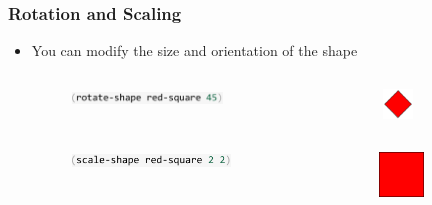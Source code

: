 \documentclass{beamer}
\begin{document}
\begin{frame}[fragile]
\frametitle{Rotation and Scaling}
	\begin{itemize}
	\item You can modify the size and orientation of the shape
	\begin{columns}[t]
		\begin{column}{.45\textwidth}
			\begin{figure}[h]
				\hspace{0.25cm}
			\includegraphics[width=4cm]{PresentationImages/rotateRedCode.pdf}
			\end{figure}
		\end{column}
		\begin{column}{.3\textwidth}
			\begin{figure}[h]
			\includegraphics[width=0.8cm]{PresentationImages/red-rectangle-rotate.png}
			\end{figure}		
		\end{column}
		\end{columns}
		
		\begin{columns}[t]
		\begin{column}{.45\textwidth}
			\begin{figure}[h]
			\hspace{0.25cm}
			\includegraphics[width=4.2cm]{PresentationImages/scaleRedCode.pdf}
			\end{figure}
		\end{column}
		\begin{column}{.3\textwidth}
			\begin{figure}[h]
			\includegraphics[width=1.2cm]{PresentationImages/red-rectangle-scale.png}
			\end{figure}		
		\end{column}
		\end{columns}
		

\end{itemize}
\end{frame}
\end{document}
